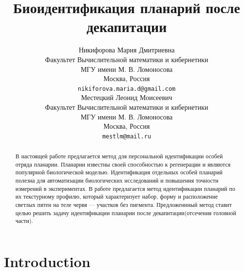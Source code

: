 \documentclass{article}
\title{Биоидентификация планарий после декапитации}
\author{ Никифорова Мария Дмитриевна\\
	Факультет Вычислительной математики и кибернетики\\
	МГУ имени М. В. Ломоносова\\
	Москва, Россия \\
	\texttt{nikiforova.maria.d@gmail.com} \\
	\And
	  Местецкий Леонид Моисеевич \\
	Факультет Вычислительной математики и кибернетики\\
	МГУ имени М. В. Ломоносова\\
	Москва, Россия \\
	\texttt{mestlm@mail.ru} \\
}
\date{}
\begin{document}
\maketitle

\begin{abstract}
	В настоящей работе предлагается метод для персональной
идентификации особей отряда планарии. 
Планарии известны своей способностью к регенерации и являются популярной биологической моделью. 
Идентификация отдельных особей планарий полезна для автоматизации биологических исследований и повышения точности измерений в экспериментах. 
В работе предлагается метод идентификации планарий по их текстурному профилю, который характеризует набор, форму и расположение светлых пятен на теле червя — участков без пигмента.
Предложеннный метод ставит целью решить задачу идентификации планарии после декапитации(отсечения головной части). 
\end{abstract}



\section{Introduction}
\end{document}
